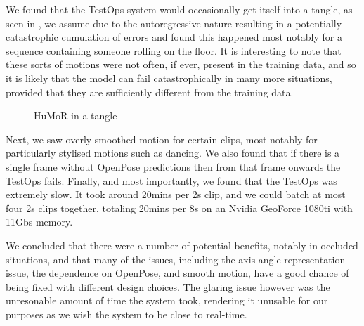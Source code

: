 We found that the TestOps system would occasionally get itself into a tangle, as seen in , we assume due to the autoregressive nature resulting in a potentially catastrophic cumulation of errors and found this happened most notably for a sequence containing someone rolling on the floor. It is interesting to note that these sorts of motions were not often, if ever, present in the training data, and so it is likely that the model can fail catastrophically in many more situations, provided that they are sufficiently different from the training data.

\begin{figure}[!ht]
    \centering
    \hfil
    \hfil
    \caption{HuMoR in a tangle}
    \label{fig:humor_bad_mess}
\end{figure}

Next, we saw overly smoothed motion for certain clips, most notably for particularly stylised motions such as dancing.  We also found that if there is a single frame without OpenPose predictions then from that frame onwards the TestOps fails. Finally, and most importantly, we found that the TestOps was extremely slow. It took around 20mins per 2s clip, and we could batch at most four 2s clips together, totaling 20mins per 8s on an Nvidia GeoForce 1080ti with 11Gbs memory.

We concluded that there were a number of potential benefits, notably in occluded situations, and that many of the issues, including the axis angle representation issue, the dependence on OpenPose, and smooth motion, have a good chance of being fixed with different design choices.  The glaring issue however was the unresonable amount of time the system took, rendering it unusable for our purposes as we wish the system to be close to real-time.


